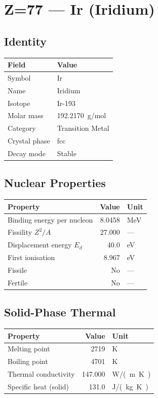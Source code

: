 \documentclass[11pt,a4paper]{article}
\begin{document}
\newpage

\section{Z=77 --- Ir (Iridium)}
\label{sec:Z77}

\subsection{Identity}
\begin{tabular}{ll}
  \toprule
  Field & Value \\
  \midrule
  Symbol & Ir \\
  Name & Iridium \\
  Isotope & Ir-193 \\
  Molar mass & \SI{192.2170}{g/mol} \\
  Category & Transition Metal \\
  Crystal phase & fcc \\
  Decay mode & Stable \\
  \bottomrule
\end{tabular}

\subsection{Nuclear Properties}
\begin{tabular}{lrl}
  \toprule
  Property & Value & Unit \\
  \midrule
  Binding energy per nucleon & 8.0458 & \si{MeV} \\
  Fissility $Z^2/A$ & 27.000 & --- \\
  Displacement energy $E_d$ & 40.0 & \si{eV} \\
  First ionisation & 8.967 & \si{eV} \\
  Fissile & No & --- \\
  Fertile & No & --- \\
  \bottomrule
\end{tabular}

\subsection{Solid-Phase Thermal}
\begin{tabular}{lrl}
  \toprule
  Property & Value & Unit \\
  \midrule
  Melting point & 2719 & \si{K} \\
  Boiling point & 4701 & \si{K} \\
  Thermal conductivity & 147.000 & \si{W/(m.K)} \\
  Specific heat (solid) & 131.0 & \si{J/(kg.K)} \\
  \bottomrule
\end{tabular}
\end{document}
